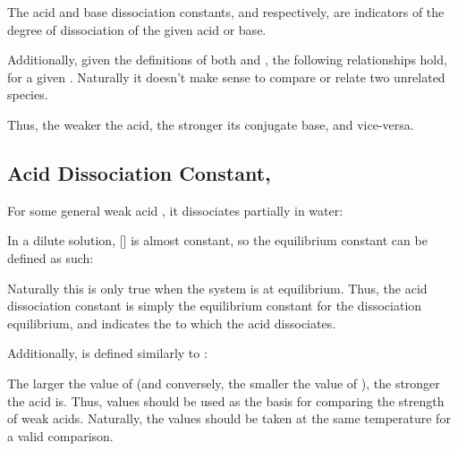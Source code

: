 		The acid and base dissociation constants, \Ka{} and \Kb{} respectively, are indicators of the degree of dissociation of the given acid
		or base.

		Additionally, given the definitions of both \Ka{} and \Kb{}, the following relationships hold, for a given
		. Naturally it doesn't make sense to compare or relate two unrelated species.


		Thus, the weaker the acid, the stronger its conjugate base, and vice-versa.


		\subsection{Acid Dissociation Constant, \texorpdfstring{\Ka{}}{Ka}}

			For some general weak acid , it dissociates partially in water:


			In a dilute solution, [] is almost constant, so the equilibrium constant can be defined as such:

			\mathdiagram{
				\[ \MKa = \frac{[\ch{H+}][\ch{A-}]}{[\ch{HA}]} \]
			}

			Naturally this is only true when the system is at equilibrium. Thus, the acid dissociation constant \Ka{} is simply the
			equilibrium constant for the dissociation equilibrium, and indicates the  to which the acid dissociates.

			Additionally, \pKa{} is defined similarly to \pKw{}:

			\mathdiagram{
				\[ \MpKa = -\lg{\MKa} \]
			}

			The larger the value of \Ka{} (and conversely, the smaller the value of \pKa{}), the stronger the acid is. Thus, \Ka{}
			values should be used as the basis for comparing the strength of weak acids. Naturally, the \Ka{} values should be
			taken at the same temperature for a valid comparison.

